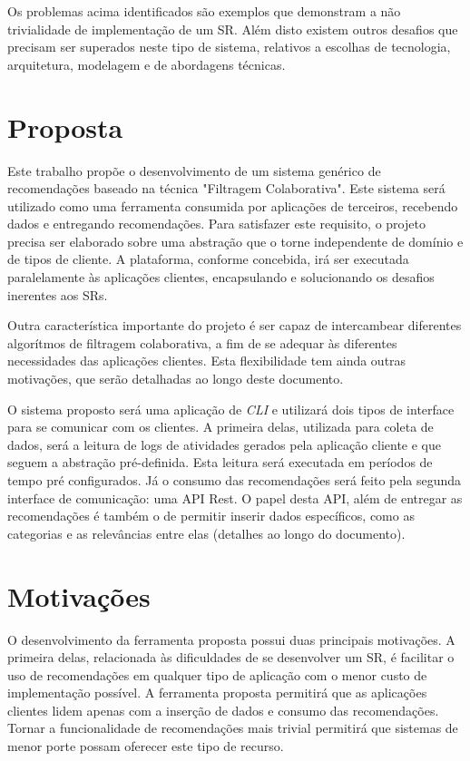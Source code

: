\documentclass[
	12pt,				%
    oneside,			%
	a4paper,			%
	english,			%
	french,				%
	spanish,			%
	brazil,				%
	]{abntex2}
\begin{document}
Os problemas acima identificados são exemplos que demonstram a não trivialidade de implementação de um SR. Além disto existem outros desafios que precisam ser
superados neste tipo de sistema, relativos a escolhas de tecnologia, arquitetura, modelagem e de abordagens técnicas. 

\section{Proposta}
Este trabalho propõe o desenvolvimento de um sistema genérico de recomendações baseado na técnica "Filtragem Colaborativa". Este sistema será utilizado como uma ferramenta
consumida por aplicações de terceiros, recebendo dados e entregando recomendações. Para satisfazer este requisito, o projeto precisa ser elaborado sobre
uma abstração que o torne independente de domínio e de tipos de cliente. A plataforma, conforme concebida, irá ser executada paralelamente às aplicações clientes,
encapsulando e solucionando os desafios inerentes aos SRs.

Outra característica importante do projeto é ser capaz de intercambear diferentes algorítmos de filtragem colaborativa, a fim de se adequar às diferentes necessidades
das aplicações clientes. Esta flexibilidade tem ainda outras motivações, que serão detalhadas ao longo deste documento. 

O sistema proposto será uma aplicação de \textit{CLI} e utilizará dois tipos de interface para se comunicar com os clientes. A primeira delas, utilizada para coleta 
de dados, será a leitura de logs de atividades gerados pela aplicação cliente e que seguem a abstração pré-definida. Esta leitura será executada em períodos 
de tempo pré configurados. Já o consumo das recomendações será feito pela segunda interface de comunicação: uma API Rest. O papel desta API, além de entregar as
recomendações é também o de permitir inserir dados específicos, como as categorias e as relevâncias entre elas (detalhes ao longo do documento). 

\section{Motivações}
O desenvolvimento da ferramenta proposta possui duas principais motivações. A primeira delas, relacionada às dificuldades de se desenvolver um SR, é facilitar o uso
de recomendações em qualquer tipo de aplicação com o menor custo de implementação possível. A ferramenta proposta permitirá que as aplicações clientes lidem apenas
com a inserção de dados e consumo das recomendações. Tornar a funcionalidade de recomendações mais trivial permitirá que sistemas de menor porte
possam oferecer este tipo de recurso.
\end{document}
